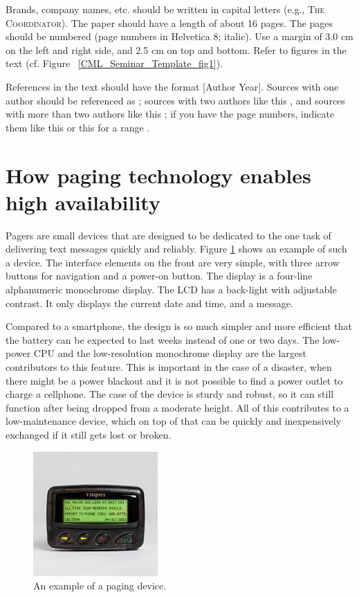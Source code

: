 \documentclass{CML_Seminar_Template}
\begin{document}
Brands, company names, etc. should be written in capital letters (e.g., \textsc{The Coordinator}). The paper should have a length of about 16 pages. The pages should be numbered (page numbers in Helvetica 8; italic). Use a margin of 3.0 cm on the left and right side, and 2.5 cm on top and bottom. Refer to figures in the text (cf. Figure ~\ref{CML_Seminar_Template_fig1}).




References in the text should have the format [Author Year]. Sources with one author should be referenced as \cite[]{Gro1995}; sources with two authors like this \cite[]{MaVa1984}, and sources with more than two authors like this \cite[]{Ham2002}; if you have the page numbers, indicate them like this \cite[p. 16]{Gro1995} or this for a range \cite[pp. 16-17]{Gro1995}. 

\section{How paging technology enables high availability}
Pagers are small devices that are designed to be dedicated to the one task of delivering text messages quickly and reliably. Figure \ref{pager_fig1} shows an example of such a device. The interface elements on the front are very simple, with three arrow buttons for navigation and a power-on button. The display is a four-line alphanumeric monochrome display. The LCD has a back-light with adjustable contrast. It only displays the current date and time, and a message.
\par
Compared to a smartphone, the design is so much simpler and more efficient that the battery can be expected to last weeks instead of one or two days. The low-power CPU and the low-resolution monochrome display are the largest contributors to this feature. This is important in the case of a disaster, when there might be a power blackout and it is not possible to find a power outlet to charge a cellphone. The case of the device is sturdy and robust, so it can still function after being dropped from a moderate height. All of this contributes to a low-maintenance device, which on top of that can be quickly and inexpensively exchanged if it still gets lost or broken.

\begin{figure}[htb]
  \begin{center}
   \includegraphics{pager_small.jpg}
  \end{center}
    \caption{\label{pager_fig1} An example of a paging device.}
\end{figure}
\end{document}
